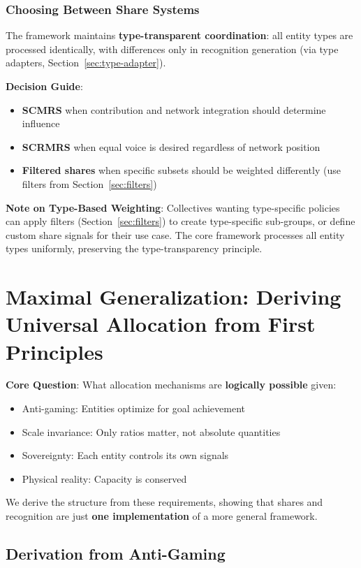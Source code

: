 \documentclass[11pt,a4paper]{article}
\theoremstyle{definition}
\theoremstyle{remark}
\begin{document}
\subsubsection{Choosing Between Share Systems}

The framework maintains \textbf{type-transparent coordination}: all entity types are processed identically, with differences only in recognition generation (via type adapters, Section~\ref{sec:type-adapter}).

\textbf{Decision Guide}:
\begin{itemize}
\item \textbf{SCMRS} when contribution and network integration should determine influence
\item \textbf{SCRMRS} when equal voice is desired regardless of network position
\item \textbf{Filtered shares} when specific subsets should be weighted differently (use filters from Section~\ref{sec:filters})
\end{itemize}

\textbf{Note on Type-Based Weighting}: Collectives wanting type-specific policies can apply filters (Section~\ref{sec:filters}) to create type-specific sub-groups, or define custom share signals for their use case. The core framework processes all entity types uniformly, preserving the type-transparency principle.

\section{Maximal Generalization: Deriving Universal Allocation from First Principles}
\label{sec:maximal-generalization}

\textbf{Core Question}: What allocation mechanisms are \textbf{logically possible} given:
\begin{itemize}
\item Anti-gaming: Entities optimize for goal achievement
\item Scale invariance: Only ratios matter, not absolute quantities
\item Sovereignty: Each entity controls its own signals
\item Physical reality: Capacity is conserved
\end{itemize}

We derive the structure from these requirements, showing that shares and recognition are just \textbf{one implementation} of a more general framework.

\subsection{Derivation from Anti-Gaming}
\end{document}
